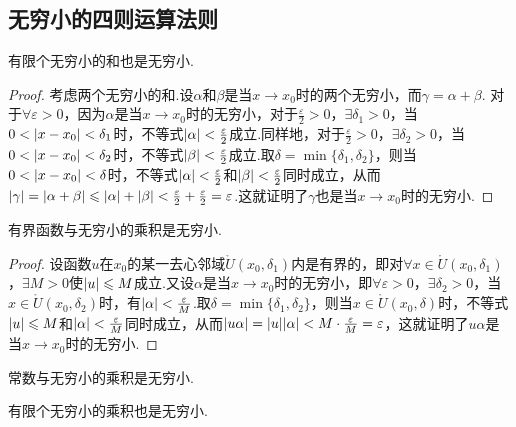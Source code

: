 \subsection{无穷小的四则运算法则}
\begin{theorem}
有限个无穷小的和也是无穷小.
\begin{proof}
考虑两个无穷小的和.设\(\alpha\)和\(\beta\)是当\(x \to x_0\)时的两个无穷小，而\(\gamma = \alpha+\beta\).
对于\(\forall\varepsilon>0\)，因为\(\alpha\)是当\(x \to x_0\)时的无穷小，对于\(\frac{\varepsilon}{2}>0\)，\(\exists \delta_1 > 0\)，当\(0<\abs{x-x_0}<\delta_1\)时，不等式\(\abs{\alpha}<\frac{\varepsilon}{2}\)成立.同样地，对于\(\frac{\varepsilon}{2}>0\)，\(\exists \delta_2 > 0\)，当\(0<\abs{x-x_0}<\delta_2\)时，不等式\(\abs{\beta}<\frac{\varepsilon}{2}\)成立.取\(\delta=\min\{\delta_1,\delta_2\}\)，则当\(0<\abs{x-x_0}<\delta\)时，不等式\(\abs{\alpha}<\frac{\varepsilon}{2}\)和\(\abs{\beta}<\frac{\varepsilon}{2}\)同时成立，从而\(\abs{\gamma}=\abs{\alpha+\beta}\leqslant\abs{\alpha}+\abs{\beta}<\frac{\varepsilon}{2}+\frac{\varepsilon}{2}=\varepsilon\).这就证明了\(\gamma\)也是当\(x \to x_0\)时的无穷小.
\end{proof}
\end{theorem}

\begin{theorem}
有界函数与无穷小的乘积是无穷小.
\begin{proof}
设函数\(u\)在\(x_0\)的某一去心邻域\(\mathring{U}(x_0,\delta_1)\)内是有界的，即对\(\forall x\in\mathring{U}(x_0,\delta_1)\)，\(\exists M>0\)使\(\abs{u} \leqslant M\)成立.又设\(\alpha\)是当\(x \to x_0\)时的无穷小，即\(\forall \varepsilon > 0\)，\(\exists \delta_2 > 0\)，当\(x\in\mathring{U}(x_0,\delta_2)\)时，有\(\abs{\alpha}<\frac{\varepsilon}{M}\).取\(\delta=\min\{\delta_1,\delta_2\}\)，则当\(x\in\mathring{U}(x_0,\delta)\)时，不等式\(\abs{u} \leqslant M\)和\(\abs{\alpha} < \frac{\varepsilon}{M}\)同时成立，从而\(\abs{u \alpha} = \abs{u}\abs{\alpha} < M \cdot \frac{\varepsilon}{M} = \varepsilon\)，这就证明了\(u \alpha\)是当\(x \to x_0\)时的无穷小.
\end{proof}
\end{theorem}

\begin{corollary}
常数与无穷小的乘积是无穷小.
\end{corollary}

\begin{corollary}
有限个无穷小的乘积也是无穷小.
\end{corollary}

